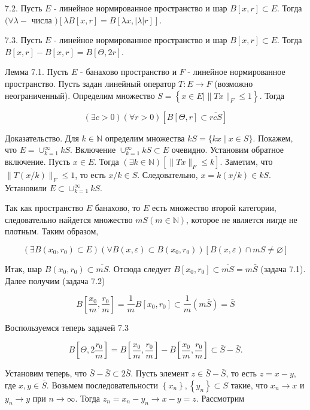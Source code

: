 7.2. Пусть $E$ - линейное нормированное пространство и шар $B[x, r] \subset E$. Тогда $(\forall \lambda-$ числа $)[\lambda B[x, r]=B[\lambda x,|\lambda| r]]$.

7.3. Пусть $E$ - линейное нормированное пространство и шар $B[x, r] \subset E$. Тогда $B[x, r]-B[x, r]=B[\Theta, 2 r]$.

Лемма 7.1. Пусть $E$ - банахово пространство и $F$ - линейное нормированное пространство. Пусть задан линейный оператор $T: E \rightarrow F$ (возможно неограниченный). Определим множество $S=\left\{x \in E \mid\|T x\|_{F} \leq 1\right\}$. Тогда

$$
(\exists c>0)(\forall r>0)[B[\Theta, r] \subset \overline{r c S}]
$$

Доказательство. Для $k \in \mathbb{N}$ определим множества $k S=\{k x \mid x \in S\}$. Покажем, что $E=\cup_{k=1}^{\infty} k S$. Включение $\cup_{k=1}^{\infty} k S \subset E$ очевидно. Установим обратное включение. Пусть $x \in E$. Тогда $(\exists k \in \mathbb{N})\left[\|T x\|_{F} \leq k\right]$. Заметим, что $\|T(x / k)\|_{F} \leq 1$, то есть $x / k \in S$. Следовательно, $x=k(x / k) \in k S$. Установили $E \subset \cup_{k=1}^{\infty} k S$.

Так как пространство $E$ банахово, то $E$ есть множество второй категории, следовательно найдется множество $m S(m \in \mathbb{N})$, которое не является нигде не плотным. Таким образом,

$$
\left(\exists B\left(x_{0}, r_{0}\right) \subset E\right)\left(\forall B(x, \varepsilon) \subset B\left(x_{0}, r_{0}\right)\right)[B(x, \varepsilon) \cap m S \neq \varnothing]
$$

Итак, шар $B\left(x_{0}, r_{0}\right) \subset \overline{m S}$. Отсюда следует $B\left[x_{0}, r_{0}\right] \subset \overline{m S}=m \bar{S}$ (задача 7.1). Далее получим (задача 7.2)

$$
B\left[\frac{x_{0}}{m}, \frac{r_{0}}{m}\right]=\frac{1}{m} B\left[x_{0}, r_{0}\right] \subset \frac{1}{m}(m \bar{S})=\bar{S}
$$

Воспользуемся теперь задачей 7.3

$$
B\left[\Theta, 2 \frac{r_{0}}{m}\right]=B\left[\frac{x_{0}}{m}, \frac{r_{0}}{m}\right]-B\left[\frac{x_{0}}{m}, \frac{r_{0}}{m}\right] \subset \bar{S}-\bar{S} .
$$

Установим теперь, что $\bar{S}-\bar{S} \subset 2 \bar{S}$. Пусть элемент $z \in \bar{S}-\bar{S}$, то есть $z=x-y$, где $x, y \in \bar{S}$. Возьмем последовательности $\left\{x_{n}\right\},\left\{y_{n}\right\} \subset S$ такие, что $x_{n} \rightarrow x$ и $y_{n} \rightarrow y$ при $n \rightarrow \infty$. Тогда $z_{n}=x_{n}-y_{n} \rightarrow x-y=z$. Рассмотрим

